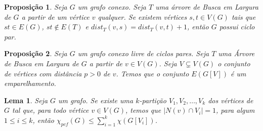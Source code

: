 \documentclass[12pt]{article}
\begin{document}
 
 \def\changemargin#1#2{\list{}{\rightmargin#2\leftmargin#1}\item[]} 
\let\endchangemargin=\endlist 
\newcommand{\wbigcup}{\mathop{\widetilde{\bigcup}}\displaylimits}

\newcommand{\ie}{\textit{i}.\textit{e}.} 
\newcommand{\blceil}{\left \lceil}
\newcommand{\brceil}{\right \rceil} 
\newcommand{\blfloor}{\left \lfloor}
\newcommand{\brfloor}{\right \rfloor} 
\newcommand{\defcomunidade}{Def.1 \ (a) \text{,} \ (b) \ \text{e} \ (c)}

\newcommand{\newbegin}{\vspace{0.5cm}}

\newcommand{\newl}{\vspace{0.1cm}}
\newcommand{\escolhe}[2]{\resizebox{!}{15pt}{$\displaystyle \binom{#1}{#2}$}}

\newtheorem{definicao}{Def} 
\newtheorem{exemplo}{Exemplo}  
\newtheorem{lema}{Lema} 
\newtheorem{teo}{Teorema} 
\newtheorem{cor}{Corolário}
\newtheorem{prop}{Proposição}
\newtheorem{defi}{Definição}



\begin{prop}
	\label{prop1}
	Seja $G$ um grafo conexo. Seja $T$ uma árvore de Busca em Largura de $G$ a partir de um vértice $v$ qualquer. Se existem vértices $s, t \in V(G)$ tais que $st \in E(G)$, $st \notin E(T)$ e $dist_T(v, s) = dist_T(v, t) + 1$, então $G$ possui ciclo par.
\end{prop} \newbegin

\begin{prop}
	\label{prop2}
	Seja $G$ um grafo conexo livre de ciclos pares. Seja $T$ uma Árvore de Busca em Largura de $G$ a partir de $v \in V(G)$. Seja $V \subsetneq V(G)$ o conjunto de vértices com distância $p > 0$ de $v$. Temos que o conjunto $E(G[V])$ é um emparelhamento.
\end{prop} \newbegin


\begin{lema}  
\label{lema1}
Seja $G$ um grafo. Se existe uma $k$-partição $V_1, V_2, \ldots ,V_k$ dos vértices de $G$ tal que, para todo vértice $v \in V(G)$, temos que $|N(v) \cap V_i| = 1$, para algum $1 \leq i \leq k$, então $\chi_{pcf}(G) \leq  \sum\limits_{i = 1}^{k} \chi(G[V_i])$.
\end{lema}
\end{document}
